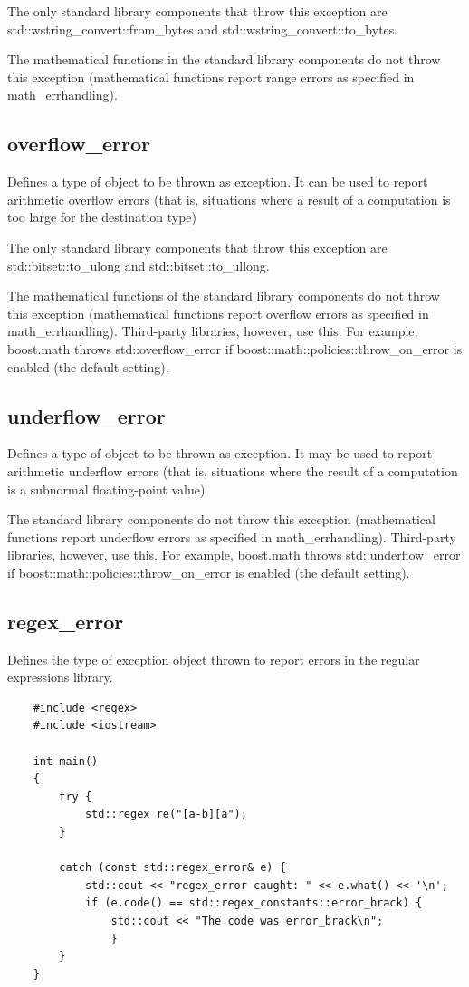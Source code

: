 \documentclass[UTF8,a4paper,12pt]{ctexbook}
\begin{document}
			The only standard library components that throw this exception are std::wstring\_convert::from\_bytes and std::wstring\_convert::to\_bytes.
			
			The mathematical functions in the standard library components do not throw this exception (mathematical functions report range errors as specified in math\_errhandling). 
		\subsection{overflow\_error}
			Defines a type of object to be thrown as exception. It can be used to report arithmetic overflow errors (that is, situations where a result of a computation is too large for the destination type)
			
			The only standard library components that throw this exception are std::bitset::to\_ulong and std::bitset::to\_ullong.
			
			The mathematical functions of the standard library components do not throw this exception (mathematical functions report overflow errors as specified in math\_errhandling). Third-party libraries, however, use this. For example, boost.math throws std::overflow\_error if boost::math::policies::throw\_on\_error is enabled (the default setting). 
		\subsection{underflow\_error}
			Defines a type of object to be thrown as exception. It may be used to report arithmetic underflow errors (that is, situations where the result of a computation is a subnormal floating-point value)
			
			The standard library components do not throw this exception (mathematical functions report underflow errors as specified in math\_errhandling). Third-party libraries, however, use this. For example, boost.math throws std::underflow\_error if boost::math::policies::throw\_on\_error is enabled (the default setting). 
		\subsection{regex\_error}
			Defines the type of exception object thrown to report errors in the regular expressions library. 
\begin{lstlisting}
	#include <regex>
	#include <iostream>
				
	int main()
	{
		try {
			std::regex re("[a-b][a");
		} 
					
		catch (const std::regex_error& e) {
			std::cout << "regex_error caught: " << e.what() << '\n';
			if (e.code() == std::regex_constants::error_brack) {
				std::cout << "The code was error_brack\n";
				}
		}
	}
\end{lstlisting}
\end{document}
